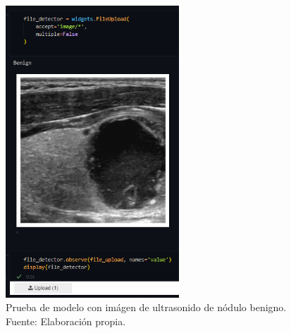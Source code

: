 \begin{figure}[H]
	\begin{center}
		\includegraphics[width=0.58\textwidth]{4/figures/upload_benign.png}
		\caption[Prueba de modelo con imágen de ultrasonido de nódulo benigno]{Prueba de modelo con imágen de ultrasonido de nódulo benigno. \\
		Fuente: Elaboración propia.}
		\label{4:fig171}
	\end{center}
\end{figure}
